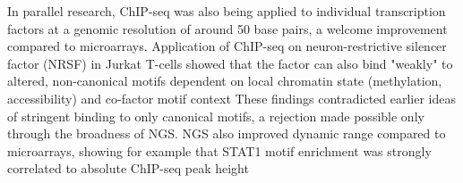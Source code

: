 In parallel research, ChIP-seq was also being applied to individual transcription factors at a genomic resolution of around 50 base pairs, a welcome improvement compared to microarrays. Application of ChIP-seq on neuron-restrictive silencer factor (NRSF) in Jurkat T-cells showed that the factor can also bind "weakly" to altered, non-canonical motifs dependent on local chromatin state (methylation, accessibility) and co-factor motif context These findings contradicted earlier ideas of stringent binding to only canonical motifs, a rejection made possible only through the broadness of NGS. NGS also improved dynamic range compared to microarrays, showing for example that STAT1 motif enrichment was strongly correlated to absolute ChIP-seq peak height


